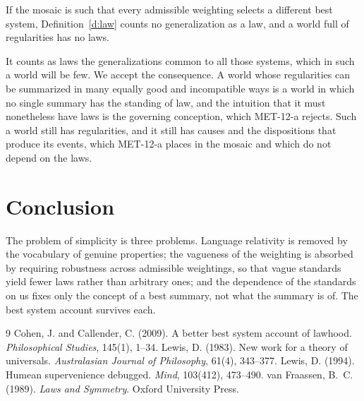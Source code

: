 \documentclass{situationist-preprint}
\begin{document}
\begin{objection}
If the mosaic is such that every admissible weighting selects a different best system, Definition~\ref{d:law} counts no generalization as a law, and a world full of regularities has no laws.
\end{objection}

\begin{reply}
It counts as laws the generalizations common to all those systems, which in such a world will be few. We accept the consequence. A world whose regularities can be summarized in many equally good and incompatible ways is a world in which no single summary has the standing of law, and the intuition that it must nonetheless have laws is the governing conception, which MET-12-a rejects. Such a world still has regularities, and it still has causes and the dispositions that produce its events, which MET-12-a places in the mosaic and which do not depend on the laws.
\end{reply}

\section{Conclusion}

The problem of simplicity is three problems. Language relativity is removed by the vocabulary of genuine properties; the vagueness of the weighting is absorbed by requiring robustness across admissible weightings, so that vague standards yield fewer laws rather than arbitrary ones; and the dependence of the standards on us fixes only the concept of a best summary, not what the summary is of. The best system account survives each.

\begin{thebibliography}{9}\small
{} Cohen, J. and Callender, C. (2009). A better best system account of lawhood. \emph{Philosophical Studies}, 145(1), 1--34.
 Lewis, D. (1983). New work for a theory of universals. \emph{Australasian Journal of Philosophy}, 61(4), 343--377.
 Lewis, D. (1994). Humean supervenience debugged. \emph{Mind}, 103(412), 473--490.
 van Fraassen, B.~C. (1989). \emph{Laws and Symmetry}. Oxford University Press.
\end{thebibliography}
\end{document}

